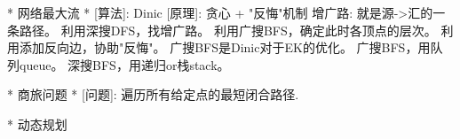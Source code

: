         * 网络最大流
        * [算法]: Dinic
                [原理]: 贪心 + "反悔"机制
                增广路: 就是源->汇的一条路径。
                    利用深搜DFS，找增广路。
                    利用广搜BFS，确定此时各顶点的层次。
                    利用添加反向边，协助"反悔"。
                    广搜BFS是Dinic对于EK的优化。
                    广搜BFS，用队列queue。
                    深搜BFS，用递归or栈stack。

        * 商旅问题
        * [问题]: 遍历所有给定点的最短闭合路径.

    * 动态规划
